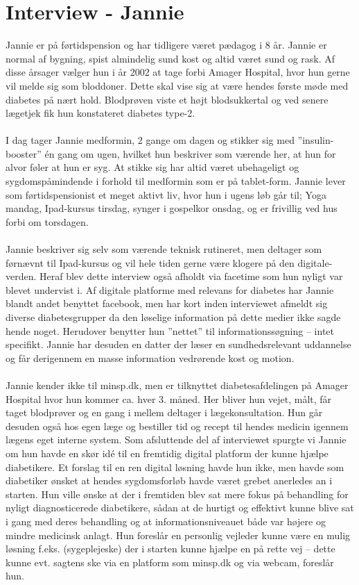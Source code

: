 \documentclass[english]{article}
\begin{document}
\section*{Interview - Jannie}
Jannie er på førtidspension og har tidligere været pædagog i 8 år. Jannie er normal af bygning, spist almindelig sund kost og altid været sund og rask. Af disse årsager vælger hun i år 2002 at tage forbi Amager Hospital, hvor hun gerne vil melde sig som bloddoner. Dette skal vise sig at være hendes første møde med diabetes på nært hold. Blodprøven viste et højt blodsukkertal og ved senere lægetjek fik hun konstateret diabetes type-2.
\\ \\
I dag tager Jannie medformin, 2 gange om dagen og stikker sig med ”insulin-booster” én gang om ugen, hvilket hun beskriver som værende her, at hun for alvor føler at hun er syg. At stikke sig har altid været ubehageligt og sygdomspåmindende i forhold til medformin som er på tablet-form. Jannie lever som førtidspensionist et meget aktivt liv, hvor hun i ugens løb går til; Yoga mandag, Ipad-kursus tirsdag, synger i gospelkor onsdag, og er frivillig ved hus forbi om torsdagen.
\\ \\
Jannie beskriver sig selv som værende teknisk rutineret, men deltager som førnævnt til Ipad-kursus og vil hele tiden gerne være klogere på den digitale-verden. Heraf blev dette interview også afholdt via facetime som hun nyligt var blevet undervist i. Af digitale platforme med relevans for diabetes har Jannie blandt andet benyttet facebook, men har kort inden interviewet afmeldt sig diverse diabetesgrupper da den løselige information på dette medier ikke sagde hende noget. Herudover benytter hun ”nettet” til informationssøgning – intet specifikt. Jannie har desuden en datter der læser en sundhedsrelevant uddannelse og får derigennem en masse information vedrørende kost og motion.
\\ \\
Jannie kender ikke til minsp.dk, men er tilknyttet diabetesafdelingen på Amager Hospital hvor hun kommer ca. hver 3. måned. Her bliver hun vejet, målt, får taget blodprøver og en gang i mellem deltager i lægekonsultation. Hun går desuden også hos egen læge og bestiller tid og recept til hendes medicin igennem lægens eget interne system.
Som afsluttende del af interviewet spurgte vi Jannie om hun havde en skør idé til en fremtidig digital platform der kunne hjælpe diabetikere. Et forslag til en ren digital løsning havde hun ikke, men havde som diabetiker ønsket at hendes sygdomsforløb havde været grebet anerledes an i starten. Hun ville ønske at der i fremtiden blev sat mere fokus på behandling for nyligt diagnosticerede diabetikere, sådan at de hurtigt og effektivt kunne blive sat i gang med deres behandling og at informationsniveauet både var højere og mindre medicinsk anlagt. Hun foreslår en personlig vejleder kunne være en mulig løsning f.eks. (sygeplejeske) der i starten kunne hjælpe en på rette vej – dette kunne evt. sagtens ske via en platform som minsp.dk og via webcam, foreslår hun.
\end{document}
